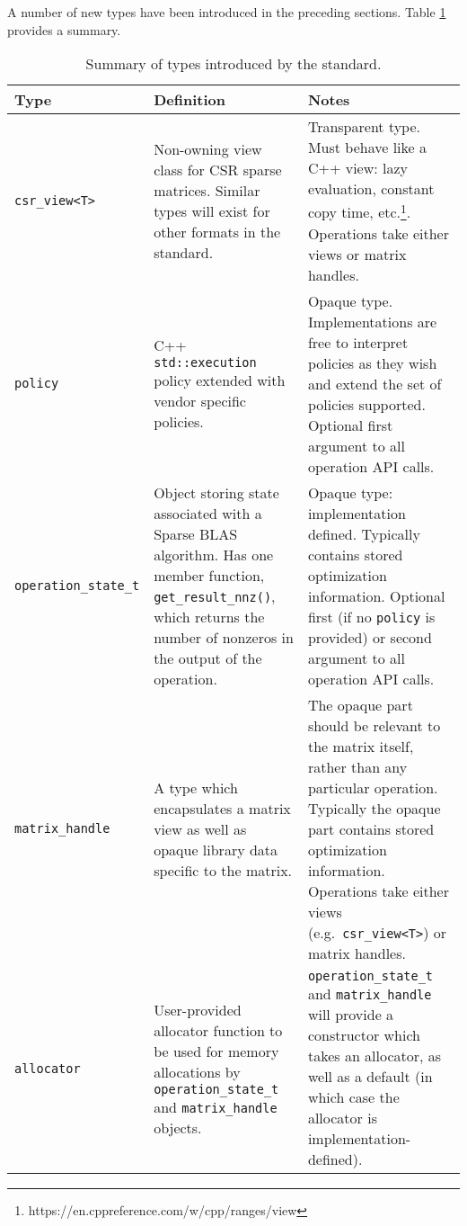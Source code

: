 \documentclass{article}
\begin{document}
\fi

\noindent

A number of new types have been introduced in the preceding sections. Table \ref{tab:newtypes} provides a summary.

\begin{table}[h]
    \centering
    \footnotesize
    \begin{tabular}{ l p{4.5cm} p{4.5cm} }%
    \toprule
    \textbf{Type} & \textbf{Definition} & \textbf{Notes}\\ 
    \midrule
        \texttt{csr\_view<T>} & Non-owning view class for CSR sparse matrices. Similar types will exist for other formats in the standard. & Transparent type. Must behave like a C++ view: lazy evaluation, constant copy time, etc.\footnote{https://en.cppreference.com/w/cpp/ranges/view}. Operations take either views or matrix handles. \\
    \midrule    
        \texttt{policy} & C++ \texttt{std::execution} policy extended with vendor specific policies. & Opaque type. Implementations are free to interpret policies as they wish and extend the set of policies supported. Optional first argument to all operation API calls. \\
    \midrule        
        \texttt{operation\_state\_t} & Object storing state associated with a Sparse BLAS algorithm. Has one member function, \texttt{get\_result\_nnz()}, which returns the number of nonzeros in the output of the operation. & Opaque type: implementation defined. Typically contains stored optimization information. Optional first (if no \texttt{policy} is provided) or second argument to all operation API calls. \\    
    \midrule        
        \texttt{matrix\_handle} & A type which encapsulates a matrix view as well as opaque library data specific to the matrix. & The opaque part should be relevant to the matrix itself, rather than any particular operation. Typically the opaque part contains stored optimization information. Operations take either views (e.g.~\texttt{csr\_view<T>}) or matrix handles. \\ 
    \midrule        
        \texttt{allocator} & User-provided allocator function to be used for memory allocations by \texttt{operation\_state\_t} and \texttt{matrix\_handle} objects. & \texttt{operation\_state\_t} and \texttt{matrix\_handle} will provide a constructor which takes an allocator, as well as a default (in which case the allocator is implementation-defined). \\
    \bottomrule
    \end{tabular}
    \caption{Summary of types introduced by the standard.} 
    \label{tab:newtypes}
\end{table}
\end{document}
